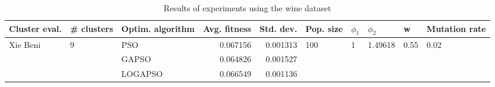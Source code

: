 \documentclass{article}
\begin{document}
\begin{table}
\centering
\caption{Results of experiments using the wine dataset}
\begin{tabular}{lllrrlllll}
\toprule
            Cluster eval. &        \# clusters & Optim. algorithm &  Avg. fitness &  Std. dev. &            Pop. size &         $\phi_{1}$ &               $\phi_{2}$ &                     w &         Mutation rate \\
\midrule
\multirow{3}{*}{Xie Beni} & \multirow{3}{*}{9} &              PSO &      0.067156 &   0.001313 & \multirow{3}{*}{100} & \multirow{3}{*}{1} & \multirow{3}{*}{1.49618} & \multirow{3}{*}{0.55} & \multirow{3}{*}{0.02} \\
                          &                    &            GAPSO &      0.064826 &   0.001527 &                      &                    &                          &                       &                       \\
                          &                    &          LOGAPSO &      0.066549 &   0.001136 &                      &                    &                          &                       &                       \\
\bottomrule
\end{tabular}
\end{table}
\end{document}
